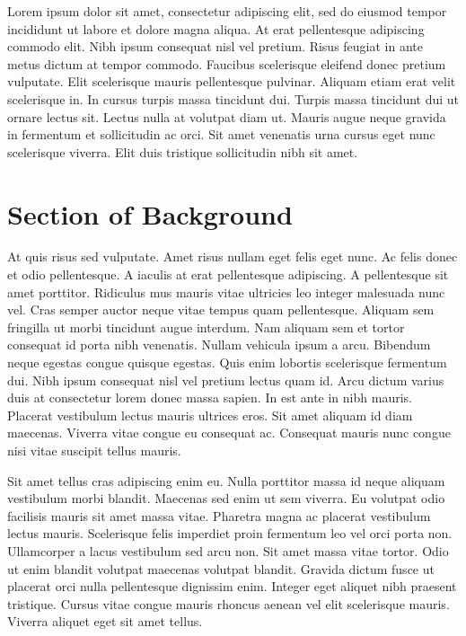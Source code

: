 Lorem ipsum dolor sit amet, consectetur adipiscing elit, sed do eiusmod tempor incididunt ut labore et dolore magna aliqua. At erat pellentesque adipiscing commodo elit. Nibh ipsum consequat nisl vel pretium. Risus feugiat in ante metus dictum at tempor commodo. Faucibus scelerisque eleifend donec pretium vulputate. Elit scelerisque mauris pellentesque pulvinar. Aliquam etiam erat velit scelerisque in. In cursus turpis massa tincidunt dui. Turpis massa tincidunt dui ut ornare lectus sit. Lectus nulla at volutpat diam ut. Mauris augue neque gravida in fermentum et sollicitudin ac orci. Sit amet venenatis urna cursus eget nunc scelerisque viverra. Elit duis tristique sollicitudin nibh sit amet.

\section{Section of Background}

At quis risus sed vulputate. Amet risus nullam eget felis eget nunc. Ac felis donec et odio pellentesque. A iaculis at erat pellentesque adipiscing. A pellentesque sit amet porttitor. Ridiculus mus mauris vitae ultricies leo integer malesuada nunc vel. Cras semper auctor neque vitae tempus quam pellentesque. Aliquam sem fringilla ut morbi tincidunt augue interdum. Nam aliquam sem et tortor consequat id porta nibh venenatis. Nullam vehicula ipsum a arcu. Bibendum neque egestas congue quisque egestas. Quis enim lobortis scelerisque fermentum dui. Nibh ipsum consequat nisl vel pretium lectus quam id. Arcu dictum varius duis at consectetur lorem donec massa sapien. In est ante in nibh mauris. Placerat vestibulum lectus mauris ultrices eros. Sit amet aliquam id diam maecenas. Viverra vitae congue eu consequat ac. Consequat mauris nunc congue nisi vitae suscipit tellus mauris.

Sit amet tellus cras adipiscing enim eu. Nulla porttitor massa id neque aliquam vestibulum morbi blandit. Maecenas sed enim ut sem viverra. Eu volutpat odio facilisis mauris sit amet massa vitae. Pharetra magna ac placerat vestibulum lectus mauris. Scelerisque felis imperdiet proin fermentum leo vel orci porta non. Ullamcorper a lacus vestibulum sed arcu non. Sit amet massa vitae tortor. Odio ut enim blandit volutpat maecenas volutpat blandit. Gravida dictum fusce ut placerat orci nulla pellentesque dignissim enim. Integer eget aliquet nibh praesent tristique. Cursus vitae congue mauris rhoncus aenean vel elit scelerisque mauris. Viverra aliquet eget sit amet tellus.

